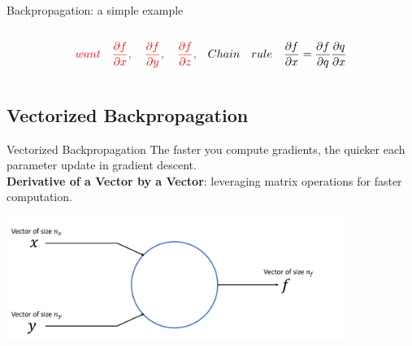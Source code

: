 \documentclass[serif, aspectratio=169]{beamer}
\begin{document}
\begin{frame}{Backpropagation: a simple example}
\begin{columns}
\begin{column}{0.6\textwidth}
\begin{center}
            \end{center}
            
            \[
            \textcolor{red}{ 
            want \quad
            \frac{\partial f}{\partial x}, \quad \frac{\partial f}{\partial y}, \quad
            \frac{\partial f}{\partial z}, \quad
            }
            Chain\quad rule \quad
            \frac{\partial f}{\partial x} =  \frac{\partial f}{\partial q}
            \frac{\partial q}{\partial x}
            \] 
            
        \end{column}

    \end{columns}

\end{frame}

\subsection{Vectorized Backpropagation}
\begin{frame}{Vectorized Backpropagation}
    The faster you compute gradients, the quicker each parameter update in gradient descent.
   \\ \textbf{Derivative of a Vector by a Vector}: leveraging matrix operations for faster computation.
    \begin{center}
        \includegraphics[width=11cm]{pic/vec2.png}  
    \end{center}
\end{frame}
\end{document}
